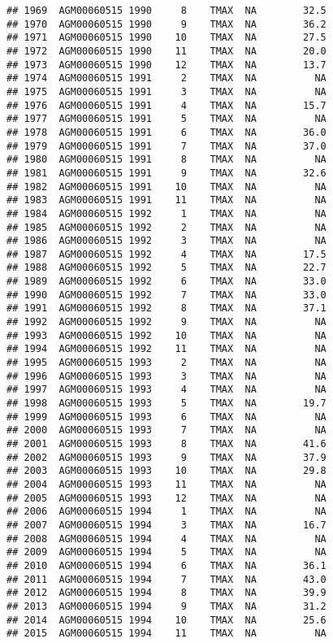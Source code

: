 \documentclass{article}\usepackage[]{graphicx}\usepackage[]{color}
\makeatletter
\newenvironment{kframe}{%
 \def\at@end@of@kframe{}%
 \ifinner\ifhmode%
  \def\at@end@of@kframe{\end{minipage}}%
  \begin{minipage}{\columnwidth}%
 \fi\fi%
 \def\FrameCommand##1{\hskip\@totalleftmargin \hskip-\fboxsep
 \colorbox{shadecolor}{##1}\hskip-\fboxsep
     \hskip-\linewidth \hskip-\@totalleftmargin \hskip\columnwidth}%
 \MakeFramed {\advance\hsize-\width
   \@totalleftmargin\z@ \linewidth\hsize
   \@setminipage}}%
 {\par\unskip\endMakeFramed%
 \at@end@of@kframe}
\newenvironment{knitrout}{}{} %
\makeatother
\begin{document}
\begin{knitrout}
\begin{kframe}
\begin{verbatim}
## 1969  AGM00060515 1990     8    TMAX  NA        32.5
## 1970  AGM00060515 1990     9    TMAX  NA        36.2
## 1971  AGM00060515 1990    10    TMAX  NA        27.5
## 1972  AGM00060515 1990    11    TMAX  NA        20.0
## 1973  AGM00060515 1990    12    TMAX  NA        13.7
## 1974  AGM00060515 1991     2    TMAX  NA          NA
## 1975  AGM00060515 1991     3    TMAX  NA          NA
## 1976  AGM00060515 1991     4    TMAX  NA        15.7
## 1977  AGM00060515 1991     5    TMAX  NA          NA
## 1978  AGM00060515 1991     6    TMAX  NA        36.0
## 1979  AGM00060515 1991     7    TMAX  NA        37.0
## 1980  AGM00060515 1991     8    TMAX  NA          NA
## 1981  AGM00060515 1991     9    TMAX  NA        32.6
## 1982  AGM00060515 1991    10    TMAX  NA          NA
## 1983  AGM00060515 1991    11    TMAX  NA          NA
## 1984  AGM00060515 1992     1    TMAX  NA          NA
## 1985  AGM00060515 1992     2    TMAX  NA          NA
## 1986  AGM00060515 1992     3    TMAX  NA          NA
## 1987  AGM00060515 1992     4    TMAX  NA        17.5
## 1988  AGM00060515 1992     5    TMAX  NA        22.7
## 1989  AGM00060515 1992     6    TMAX  NA        33.0
## 1990  AGM00060515 1992     7    TMAX  NA        33.0
## 1991  AGM00060515 1992     8    TMAX  NA        37.1
## 1992  AGM00060515 1992     9    TMAX  NA          NA
## 1993  AGM00060515 1992    10    TMAX  NA          NA
## 1994  AGM00060515 1992    11    TMAX  NA          NA
## 1995  AGM00060515 1993     2    TMAX  NA          NA
## 1996  AGM00060515 1993     3    TMAX  NA          NA
## 1997  AGM00060515 1993     4    TMAX  NA          NA
## 1998  AGM00060515 1993     5    TMAX  NA        19.7
## 1999  AGM00060515 1993     6    TMAX  NA          NA
## 2000  AGM00060515 1993     7    TMAX  NA          NA
## 2001  AGM00060515 1993     8    TMAX  NA        41.6
## 2002  AGM00060515 1993     9    TMAX  NA        37.9
## 2003  AGM00060515 1993    10    TMAX  NA        29.8
## 2004  AGM00060515 1993    11    TMAX  NA          NA
## 2005  AGM00060515 1993    12    TMAX  NA          NA
## 2006  AGM00060515 1994     1    TMAX  NA          NA
## 2007  AGM00060515 1994     3    TMAX  NA        16.7
## 2008  AGM00060515 1994     4    TMAX  NA          NA
## 2009  AGM00060515 1994     5    TMAX  NA          NA
## 2010  AGM00060515 1994     6    TMAX  NA        36.1
## 2011  AGM00060515 1994     7    TMAX  NA        43.0
## 2012  AGM00060515 1994     8    TMAX  NA        39.9
## 2013  AGM00060515 1994     9    TMAX  NA        31.2
## 2014  AGM00060515 1994    10    TMAX  NA        25.6
## 2015  AGM00060515 1994    11    TMAX  NA          NA

\end{verbatim}
\end{kframe}
\end{knitrout}
\end{document}
